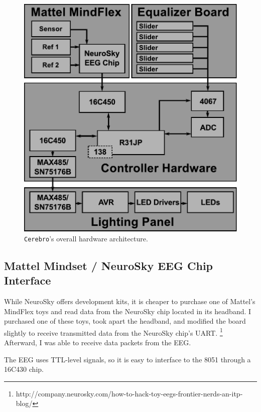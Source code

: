 \documentclass[letterpaper,10pt,notitlepage]{report}
\newcommand{\projname}{\texttt{Cerebro}}
\begin{document}
    \begin{figure}[h!]
    \begin{center}
        \includegraphics[scale=.4]{fig/blockdiagram.pdf}
        \caption{\projname{}'s overall hardware architecture.}
        \label{fig:hw}
    \end{center}
    \end{figure}

    \subsection{Mattel Mindset / NeuroSky EEG Chip Interface}

    While NeuroSky offers development kits, it is cheaper to purchase one of 
    Mattel's MindFlex toys and read data from the NeuroSky chip located in its 
    headband.  I purchased one of these toys, took apart the headband, and 
    modified the board slightly to receive transmitted data from the NeuroSky 
    chip's UART.%
        \footnote{http://company.neurosky.com/how-to-hack-toy-eegs-frontier-nerds-an-itp-blog/}
    Afterward, I was able to receive data packets from the EEG.

    The EEG uses TTL-level signals, so it is easy to interface to the 8051 
    through a 16C430 chip.
    
\end{document}
